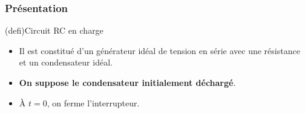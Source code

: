 \documentclass[../../main/main.tex]{subfiles}
\begin{document}
\subsubsection{Présentation}
\begin{tcb*}[sidebyside, righthand ratio=.30](defi){Circuit RC en charge}
  \begin{itemize}
    \item Il est constitué d'un générateur idéal de tension en série avec une
          résistance et un condensateur idéal.
    \item \textbf{On suppose le condensateur initialement déchargé}.
    \item À $t=0$, on ferme l'interrupteur.
  \end{itemize}
\tcblower
  \begin{center}
    \label{fig:circ_rc-start}
  \end{center}
\end{tcb*}
\end{document}
